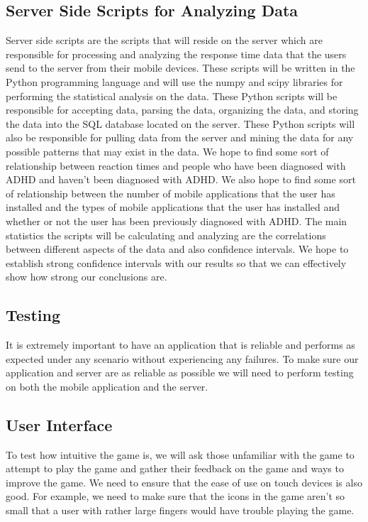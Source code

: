 \documentclass[a4wide]{article}
\begin{document}
\subsection{Server Side Scripts for Analyzing Data}
\- Server side scripts are the scripts that will reside on the server which are responsible for processing and analyzing the response time data that the users send to the server from their mobile devices. These scripts will be written in the Python programming language and will use the numpy and scipy libraries for performing the statistical analysis on the data.\newline
\- These Python scripts will be responsible for accepting data, parsing the data, organizing the data, and storing the data into the SQL database located on the server. These Python scripts will also be responsible for pulling data from the server and mining the data for any possible patterns that may exist in the data. We hope to find  some sort of relationship between reaction times and people who have been diagnosed with ADHD and haven't been diagnosed with ADHD. We also hope to find some sort of relationship between the number of mobile applications that the user has installed and the types of mobile applications that the user has installed and whether or not the user has been previously diagnosed with ADHD. The main statistics the scripts will be calculating and analyzing are the correlations between different aspects of the data and also confidence intervals. We hope to establish strong confidence intervals with our results so that we can effectively show how strong our conclusions are.

\subsection{Testing}
\- It is extremely important to have an application that is reliable and performs as expected under any scenario without experiencing any failures. To make sure our application and server are as reliable as possible we will need to perform testing on both the mobile application and the server.
\subsection{User Interface}
\-To test how intuitive the game is, we will ask those unfamiliar with the game to attempt to play the game and gather their feedback on the game and ways to improve the game. We need to ensure that the ease of use on touch devices is also good. For example, we need to make sure that the icons in the game aren't so small that a user with rather large fingers would have trouble playing the game.
\end{document}
